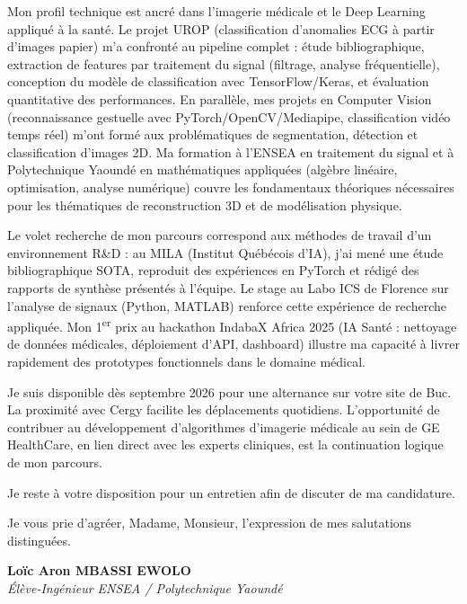 \documentclass[a4paper,11pt]{article}
\begin{document}
Mon profil technique est ancré dans l'imagerie médicale et le Deep Learning appliqué à la santé. Le projet UROP (classification d'anomalies ECG à partir d'images papier) m'a confronté au pipeline complet : étude bibliographique, extraction de features par traitement du signal (filtrage, analyse fréquentielle), conception du modèle de classification avec TensorFlow/Keras, et évaluation quantitative des performances. En parallèle, mes projets en Computer Vision (reconnaissance gestuelle avec PyTorch/OpenCV/Mediapipe, classification vidéo temps réel) m'ont formé aux problématiques de segmentation, détection et classification d'images 2D. Ma formation à l'ENSEA en traitement du signal et à Polytechnique Yaoundé en mathématiques appliquées (algèbre linéaire, optimisation, analyse numérique) couvre les fondamentaux théoriques nécessaires pour les thématiques de reconstruction 3D et de modélisation physique.

Le volet recherche de mon parcours correspond aux méthodes de travail d'un environnement R\&D : au MILA (Institut Québécois d'IA), j'ai mené une étude bibliographique SOTA, reproduit des expériences en PyTorch et rédigé des rapports de synthèse présentés à l'équipe. Le stage au Labo ICS de Florence sur l'analyse de signaux (Python, MATLAB) renforce cette expérience de recherche appliquée. Mon 1\textsuperscript{er} prix au hackathon IndabaX Africa 2025 (IA Santé : nettoyage de données médicales, déploiement d'API, dashboard) illustre ma capacité à livrer rapidement des prototypes fonctionnels dans le domaine médical.

Je suis disponible dès septembre 2026 pour une alternance sur votre site de Buc. La proximité avec Cergy facilite les déplacements quotidiens. L'opportunité de contribuer au développement d'algorithmes d'imagerie médicale au sein de GE HealthCare, en lien direct avec les experts cliniques, est la continuation logique de mon parcours.

Je reste à votre disposition pour un entretien afin de discuter de ma candidature.

Je vous prie d'agréer, Madame, Monsieur, l'expression de mes salutations distinguées.

\vspace{0.8cm}

\textbf{Loïc Aron MBASSI EWOLO}\\
\textit{Élève-Ingénieur ENSEA / Polytechnique Yaoundé}
\end{document}
